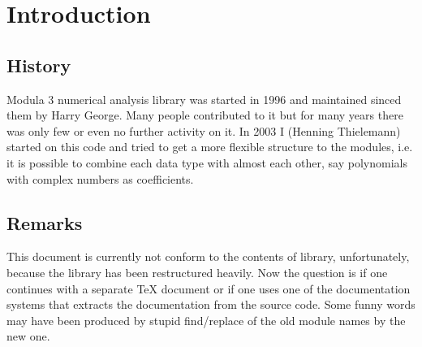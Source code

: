 \section{Introduction}

\subsection{History}

Modula 3 numerical analysis library was started in 1996 and
maintained sinced them by Harry George.
Many people contributed to it
but for many years there was only few or even no further activity on it.
In 2003 I (Henning Thielemann) started on this code
and tried to get a more flexible structure to the modules,
i.e. it is possible to combine each data type with almost each other,
say polynomials with complex numbers as coefficients.

\subsection{Remarks}

This document is currently not conform
to the contents of library, unfortunately,
because the library has been restructured heavily.
Now the question is
if one continues with a separate TeX document
or if one uses one of the documentation systems
that extracts the documentation from the source code.
Some funny words may have been produced by stupid
find/replace of the old module names by the new one.
